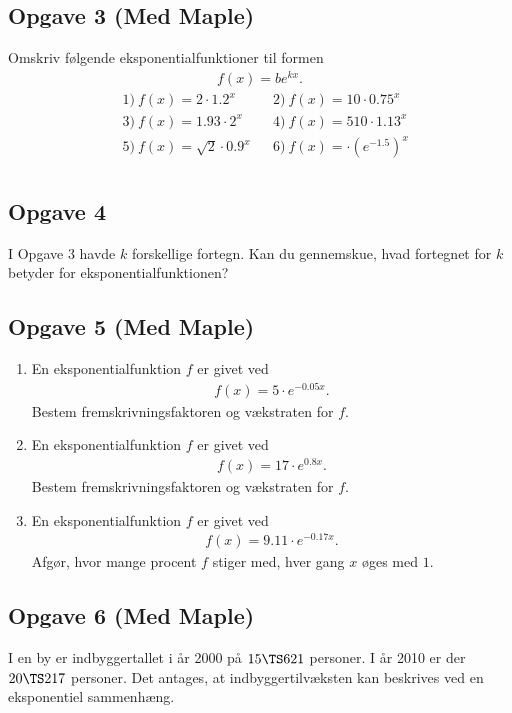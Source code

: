 \subsection*{Opgave 3 (Med Maple)}
Omskriv følgende eksponentialfunktioner til formen
\begin{align*}
	f(x) = be^{kx}.
\end{align*}
\begin{align*}
	&1) \ f(x) = 2\cdot 1.2^x   &    &2) \  f(x) = 10\cdot 0.75^x \\
	&3) \ f(x) = 1.93\cdot 2^x   &    &4) \  f(x) = 510 \cdot 1.13^x \\
	&5) \ f(x) = \sqrt{2}\cdot 0.9^x   &    &6) \  f(x) = \cdot (e^{-1.5})^x \\
\end{align*}

\subsection*{Opgave 4}
I Opgave 3 havde $k$ forskellige fortegn. Kan du gennemskue, hvad fortegnet for $k$ betyder for eksponentialfunktionen?

\subsection*{Opgave 5 (Med Maple)}
\begin{enumerate}[label = \roman*)]
	\item En eksponentialfunktion $f$ er givet ved
	\begin{align*}
		f(x) = 5\cdot e^{-0.05x}.
	\end{align*}
	Bestem fremskrivningsfaktoren og vækstraten for $f$. 
	\item En eksponentialfunktion $f$ er givet ved
	\begin{align*}
		f(x) = 17 \cdot e^{0.8x}.
	\end{align*}
	Bestem fremskrivningsfaktoren og vækstraten for $f$. 
	\item En eksponentialfunktion $f$ er givet ved
	\begin{align*}
		f(x) = 9.11\cdot e^{-0.17x}.
	\end{align*}
	Afgør, hvor mange procent $f$ stiger med, hver gang $x$ øges med $1$. 
\end{enumerate}

\subsection*{Opgave 6 (Med Maple)}
I en by er indbyggertallet i år 2000 på $15\TS 621$ personer. I år 2010 er der $20\TS 217$ personer. 
Det antages, at indbyggertilvæksten kan beskrives ved en eksponentiel sammenhæng. 

